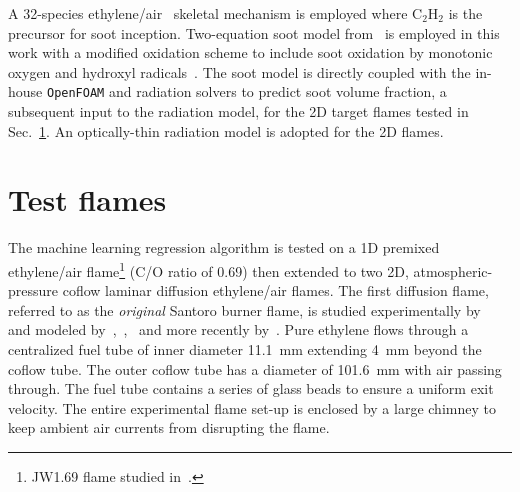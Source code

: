 \documentclass[12pt]{CHT-20}
\begin{document}

A 32-species ethylene/air~\citep[]{Lu_skeletalMech} skeletal mechanism is employed where C$_2$H$_2$ is the precursor for soot inception. Two-equation soot model from~\citet{Leung_Lindstedt_Jones} is employed in this work with a modified oxidation scheme to include soot oxidation by monotonic oxygen and hydroxyl radicals~\citep[]{Guo2004}. The soot model is directly coupled with the in-house \texttt{OpenFOAM} and radiation solvers to predict soot volume fraction, a subsequent input to the radiation model, for the 2D target flames tested in Sec.~\ref{sec:testFlames}. An optically-thin radiation model is adopted for the 2D flames.  
 






\section{Test flames} \label{sec:testFlames}
The machine learning regression algorithm is tested on a 1D premixed ethylene/air flame\footnote{JW1.69 flame studied in~\citet{Roy}.} (C/O ratio of 0.69) then extended to two 2D, atmospheric-pressure coflow laminar diffusion ethylene/air flames. The first diffusion flame, referred to as the \emph{original} Santoro burner flame, is studied experimentally by~\citet{Santoro1983,Santoro1987} and modeled by~\citet{Kennedy1996},~\citet{DAnna2007},~\citet{Dworkin2011} and more recently by~\citet{Dasgupta2015}. Pure ethylene flows through a centralized fuel tube of inner diameter 11.1~mm extending 4~mm beyond the coflow tube. The outer coflow tube has a diameter of 101.6~mm with air passing through. The fuel tube contains a series of glass beads to ensure a uniform exit velocity. The entire experimental flame set-up is enclosed by a large chimney to keep ambient air currents from disrupting the flame. 
\end{document}
